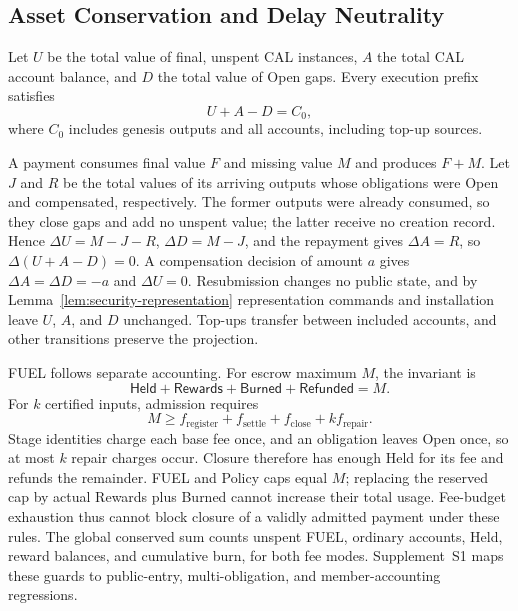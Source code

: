 \subsection{Asset Conservation and Delay Neutrality}
\label{sec:security-conservation}

\begin{theorem}
\label{thm:security-conservation}
Let $U$ be the total value of final, unspent CAL instances, $A$ the total
CAL account balance, and $D$ the total value of Open gaps. Every
execution prefix satisfies
\begin{equation}
 U+A-D=C_0,
 \label{eq:security-conservation}
\end{equation}
where $C_0$ includes genesis outputs and all accounts, including top-up
sources.
\end{theorem}
\begin{IEEEproof}
A payment consumes final value $F$ and missing value $M$ and produces $F+M$. Let $J$ and $R$ be the total values of its arriving outputs whose obligations were Open and compensated, respectively. The former outputs were already consumed, so they close gaps and add no unspent value; the latter receive no creation record. Hence $\Delta U=M-J-R$, $\Delta D=M-J$, and the repayment gives $\Delta A=R$, so $\Delta(U+A-D)=0$. A compensation decision of amount $a$ gives $\Delta A=\Delta D=-a$ and $\Delta U=0$. Resubmission changes no public state, and by Lemma~\ref{lem:security-representation} representation commands and installation leave $U$, $A$, and $D$ unchanged. Top-ups transfer between included accounts, and other transitions preserve the projection.
\end{IEEEproof}

FUEL follows separate accounting. For escrow maximum $M$, the invariant is
\[
 \mathsf{Held}+\mathsf{Rewards}+\mathsf{Burned}+\mathsf{Refunded}=M.
\]
For $k$ certified inputs, admission requires
\[
 M\ge f_{\mathrm{register}}+f_{\mathrm{settle}}+f_{\mathrm{close}}
       +k f_{\mathrm{repair}}.
\]
Stage identities charge each base fee once, and an obligation leaves Open
once, so at most $k$ repair charges occur. Closure therefore has enough Held
for its fee and refunds the remainder. FUEL and Policy caps equal $M$;
replacing the reserved cap by actual Rewards plus Burned cannot increase
their total usage. Fee-budget exhaustion thus cannot block closure of a
validly admitted payment under these rules. The global conserved sum counts
unspent FUEL, ordinary accounts, Held, reward balances, and cumulative burn,
for both fee modes. Supplement~S1 maps these guards to public-entry,
multi-obligation, and member-accounting regressions.

